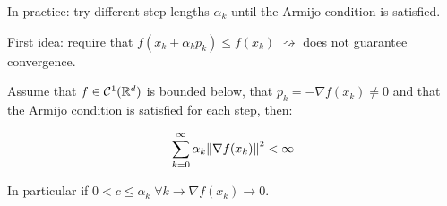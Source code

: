 In practice: try different step lengths $\alpha_k$ until the Armijo condition is satisfied.

First idea: require that $f(x_k + \alpha_k p_k) \leq f(x_k)$ $\rightsquigarrow$ does not guarantee convergence.

\begin{lemma}{}{}
    Assume that $f \in \mathcal{C}^1(\mathbb{R}^d)$ is bounded below, that $p_k = - \nabla f(x_k) \neq 0$ and that the Armijo condition is satisfied for each step, then:

    \[
        \sum_{k=0}^{\infty} \alpha_k \norm{\nabla f(x_k)}^2 < \infty
    \]

    In particular if $0 < c \leq \alpha_k \; \forall k \rightarrow \nabla f(x_k) \rightarrow 0$.
\end{lemma}

